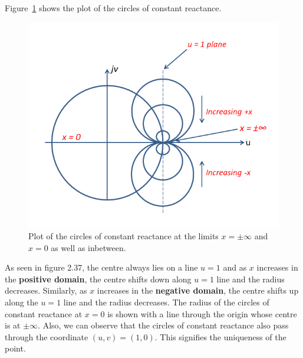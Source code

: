 Figure~\ref{fig:uytrdbn} shows the plot of the circles of constant reactance.
\begin{figure}[h]
\centering
\includegraphics[width=1\linewidth]{graphics/plot_of_const_reactance_circles}
\caption{Plot of the circles of constant reactance at the limits $x = \pm\infty$ and $x = 0$ as well as inbetween.}
\label{fig:uytrdbn}
\end{figure}

As seen in figure 2.37, the centre always lies on a line $u = 1$ and as $x$ increases in the \textbf{positive domain}, the centre shifts down along $u = 1$ line and the radius decreases. Similarly, as $x$ increases in the \textbf{negative domain}, the centre shifts up along the $u = 1$ line and the radius decreases. The radius of the circles of constant reactance at $x = 0$ is shown with a line through the origin whose centre is at $\pm\infty$. Also, we can observe that the circles of constant reactance also pass through the coordinate $(u,v) = (1,0)$. This signifies the uniqueness of the point. 

